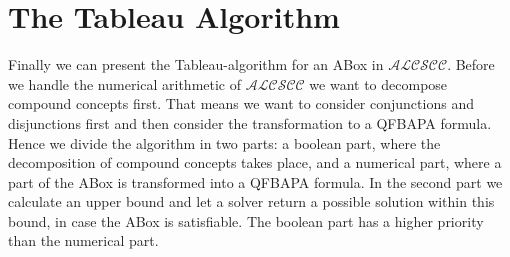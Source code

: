 \documentclass{book}
\theoremstyle{break}
\theoremstyle{definition}
\begin{document}
\section{The Tableau Algorithm}\label{Tableau}
Finally we can present the Tableau-algorithm for an ABox in $\mathcal{ALCSCC}$. Before we handle the numerical arithmetic of $\mathcal{ALCSCC}$ we want to decompose compound concepts first. That means we want to consider conjunctions and disjunctions first and then consider the transformation to a QFBAPA formula. Hence we divide the algorithm in two parts: a boolean part, where the decomposition of compound concepts takes place, and a numerical part, where a part of the ABox is transformed into a QFBAPA formula. In the second part we calculate an upper bound and let a solver return a possible solution within this bound, in case the ABox is satisfiable. The boolean part has a higher priority than the numerical part. 
\end{document}
